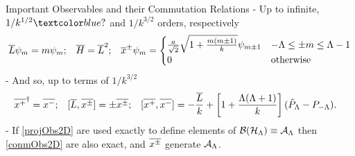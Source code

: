 \begin{frame}{Important Observables and their Commutation Relations} %
    - Up to infinite, $1/k^{1/2}\dbtext{?}$ and $1/k^{3/2}$ orders, respectively
    \begin{align}
    \label{projObs2D}
        \overline{L} \psi_m &= m \psi_m; & 
        \overline{H} &= \overline{L}^2; & 
        \overline{x}^\pm \psi_m = 
            \begin{cases}
                \frac{a}{\sqrt{2}} \sqrt{ 1 + \frac{m(m \pm 1)}{k} } \psi_{m \pm 1} & -\Lambda \leq \pm m \leq \Lambda - 1 \\
                0 & \text{otherwise}
            \end{cases}
    \end{align}
    - And so, up to terms of $1/k^{3/2}$
    \begin{align}
        \label{conmObs2D}
        \overline{x^+}^\dagger &= \overline{x^-}; &
        [\overline{L}, \overline{x^\pm}] &= \pm \overline{x^\pm}; &
        [\overline{x^+}, \overline{x^-}] &= - \frac{\overline{L}}{k} + \left[1 + \frac{\Lambda(\Lambda+1)}{k}\right] (\tilde P_{\Lambda} - P_{-\Lambda}).
    \end{align}
     - If \eqref{projObs2D} are used exactly to define elements of $\mathcal B(\mathcal H_\Lambda) \equiv \mathcal A_\Lambda$ then \eqref{conmObs2D} are also exact, and $\overline{x^\pm}$ generate $\mathcal A_\Lambda$. %
    
\end{frame}

